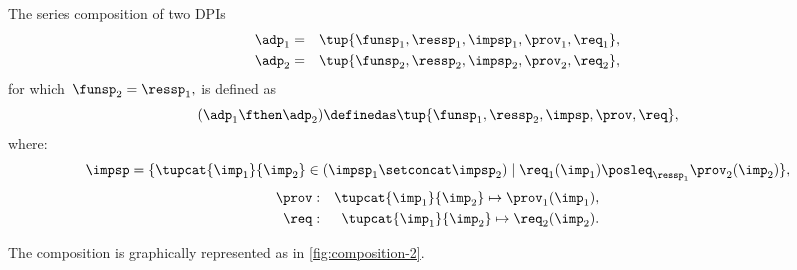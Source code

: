 \begin{definition}
    \label{def:series-composition}
    The series composition of two DPIs
    \begin{equation}
        \begin{aligned}
            \adp_{1}&=&\tup{\funsp_{1},\ressp_{1},\impsp_{1},\prov_{1},\req_{1}},
            \\
            \adp_{2}&=&\tup{\funsp_{2},\ressp_{2},\impsp_{2},\prov_{2},\req_{2}},
        \end{aligned}
    \end{equation}
    for which~$\funsp_{2}=\ressp_{1},$ is defined as
    \begin{equation}
    (\adp_{1} \fthen \adp_{2})
        \definedas
        \tup{ \funsp_{1},\ressp_{2},\impsp,\prov,\req},
    \end{equation}
    where:
    \begin{equation}
        \impsp  =  \{  \tupcat {\imp_{1}} {\imp_{2}} \in (\impsp_{1} \setconcat \impsp_{2})\mid\req_{1}(\imp_{1})\posleq_{\ressp_{1}}\prov_{2}(\imp_{2})\},
    \end{equation}
    \begin{equation}
        \begin{aligned}
            \prov & : & \tupcat {\imp_{1}} {\imp_{2}}   \mapsto\prov_{1}(\imp_{1}),\\
            \req & : & \tupcat {\imp_{1}} {\imp_{2}} \mapsto\req_{2}(\imp_{2}).
        \end{aligned}
    \end{equation}
\end{definition}

The composition is graphically represented as in \cref{fig:composition-2}.

\begin{marginfigure}
    \label{fig:composition-2}
    \begin{center}
    \end{center}
\end{marginfigure}


